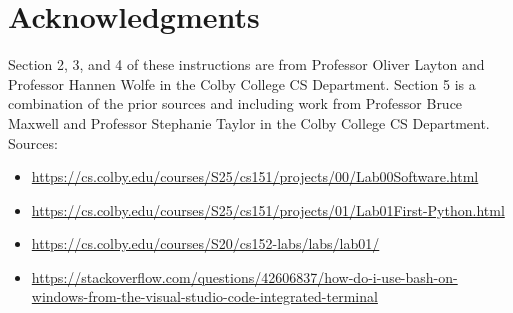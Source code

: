 \documentclass[12pt]{article}
\begin{document}
\section{Acknowledgments}
Section 2, 3, and 4 of these instructions are from Professor Oliver Layton and Professor Hannen Wolfe in the Colby College CS Department. Section 5 is a combination of the prior sources and including work from Professor Bruce Maxwell and Professor Stephanie Taylor in the Colby College CS Department. 
Sources:
\begin{itemize}
\item \footnotesize{\url{https://cs.colby.edu/courses/S25/cs151/projects/00/Lab00Software.html}}
\item \url{https://cs.colby.edu/courses/S25/cs151/projects/01/Lab01First-Python.html}
\item \url{https://cs.colby.edu/courses/S20/cs152-labs/labs/lab01/}
\item \url{https://stackoverflow.com/questions/42606837/how-do-i-use-bash-on-windows-from-the-visual-studio-code-integrated-terminal}
\end{itemize}
\end{document}

